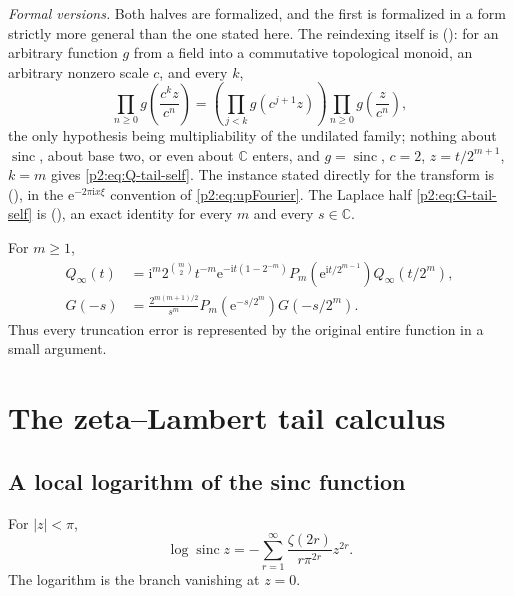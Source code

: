 \documentclass[11pt,oneside]{article}
\numberwithin{equation}{section}
\theoremstyle{definition}
\theoremstyle{remark}
\newcommand{\C}{\mathbb C}
\newcommand{\e}{\mathrm e}
\newcommand{\ii}{\mathrm i}
\newcommand{\sinc}{\operatorname{sinc}}
\begin{document}
\emph{Formal versions.}  Both halves are formalized, and the first is formalized in a form
strictly more general than the one stated here.  The reindexing itself is
 (): for an arbitrary
function $g$ from a field into a commutative topological monoid, an arbitrary nonzero scale
$c$, and every $k$,
\[
 \prod_{n\ge0}g\!\left(\frac{c^kz}{c^n}\right)
 =\left(\prod_{j<k}g\!\left(c^{j+1}z\right)\right)\prod_{n\ge0}g\!\left(\frac{z}{c^n}\right),
\]
the only hypothesis being multipliability of the undilated family; nothing about $\sinc$,
about base two, or even about $\C$ enters, and $g=\sinc$, $c=2$, $z=t/2^{m+1}$, $k=m$ gives
\eqref{p2:eq:Q-tail-self}.  The instance stated directly for the transform is
 (), in the
$\e^{-2\pi\ii x\xi}$ convention of \eqref{p2:eq:upFourier}.  The Laplace half
\eqref{p2:eq:G-tail-self} is 
(), an exact identity for every $m$ and every $s\in\C$.

\begin{corollary}
\label{p2:cor:full-TM-factor}
For $m\ge1$,
\begin{align}
 Q_\infty(t)
 &=\ii^m2^{\binom m2}t^{-m}\e^{-\ii t(1-2^{-m})}
   P_m\!\left(\e^{\ii t/2^{m-1}}\right)Q_\infty(t/2^m),
 \label{p2:eq:full-Q-TM}\\
 G(-s)
 &=\frac{2^{m(m+1)/2}}{s^m}
   P_m\!\left(\e^{-s/2^m}\right)G(-s/2^m).
 \label{p2:eq:full-G-TM}
\end{align}
Thus every truncation error is represented by the original entire function in a small
argument.
\end{corollary}

\section{The zeta--Lambert tail calculus}
\label{p2:sec:zeta-tail}

\subsection{A local logarithm of the sinc function}

\begin{lemma}
\label{p2:lem:logsinc}
For $|z|<\pi$,
\begin{equation}
 \boxed{
 \log\sinc z
 =-\sum_{r=1}^{\infty}\frac{\zeta(2r)}{r\pi^{2r}}z^{2r}.}
 \label{p2:eq:logsinc}
\end{equation}
The logarithm is the branch vanishing at $z=0$.
\end{lemma}
\end{document}
